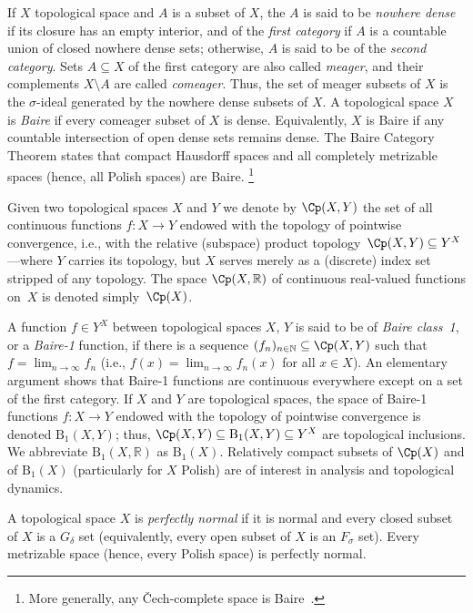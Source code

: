 If $X$ topological space and $A$ is a subset of $X$, the $A$ is said to be
\emph{nowhere dense} if its closure has an empty interior,
and of the \emph{first category} if $A$ is a countable union of closed nowhere dense sets;
otherwise, $A$ is said to be of the \emph{second category}.
Sets $A\subseteq X$ of the first category are also called \emph{meager}, and their
complements $X\setminus A$ are called \emph{comeager}.
Thus, the set of meager subsets of $X$ is the $\sigma$-ideal generated by the nowhere dense subsets of $X$.
A topological space $X$ is \emph{Baire} if every comeager subset of $X$ is dense.
Equivalently, $X$ is Baire if any countable intersection of open dense sets remains dense.
The Baire Category Theorem states that compact Hausdorff spaces and all completely metrizable spaces (hence, all Polish spaces) are Baire.%
\footnote{More generally, any Čech-complete space is Baire~\cite[Theorem 3.9.3]{Engelking:1989}.}

Given two topological spaces $X$ and $Y$ we denote by $\Cp(X,Y)$ the set of all continuous functions $f:X\rightarrow Y$ endowed with the topology of pointwise convergence, i.e., with the relative (subspace) product topology~$\Cp(X,Y)\subseteq Y^X$—where $Y$ carries its topology, but $X$ serves merely as a (discrete) index set stripped of any topology.
The space $\Cp(X, \mathbb{R})$ of continuous real-valued functions on~$X$ is denoted simply~$\Cp(X)$.

A function $f\in Y^X$ between topological spaces $X$, $Y$ is said to be of \emph{Baire class~1}, or a \emph{Baire-1} function, if there is a sequence $(f_n)_{n\in \mathbb{N}}\subseteq \Cp(X, Y)$ such that $f = \lim_{n\to\infty}f_n$ (i.e., $f(x)=\lim_{n\to\infty}f_n(x)$ for all $x\in X$).
An elementary argument shows that Baire-1 functions are continuous everywhere except on a set of the first category.
If $X$ and $Y$ are topological spaces, the space of Baire-1 functions $f:X\rightarrow Y$ endowed with the topology of pointwise convergence is denoted $\mathrm{B}_1(X,Y)$;
thus, $\Cp(X,Y)\subseteq \mathrm{B}_1(X,Y)\subseteq Y^X$ are topological inclusions.
We abbreviate $\mathrm{B}_1(X, \mathbb{R})$ as $\mathrm{B}_1(X)$.
Relatively compact subsets of $\Cp(X)$ and of $\mathrm{B}_1(X)$ (particularly for $X$ Polish) are of interest in analysis and topological dynamics.

A topological space $X$ is \emph{perfectly normal} if it is normal and every closed subset of $X$ is a $G_\delta$ set (equivalently, every open subset of $X$ is an $F_\sigma$ set).
Every metrizable space (hence, every Polish space) is perfectly normal.

